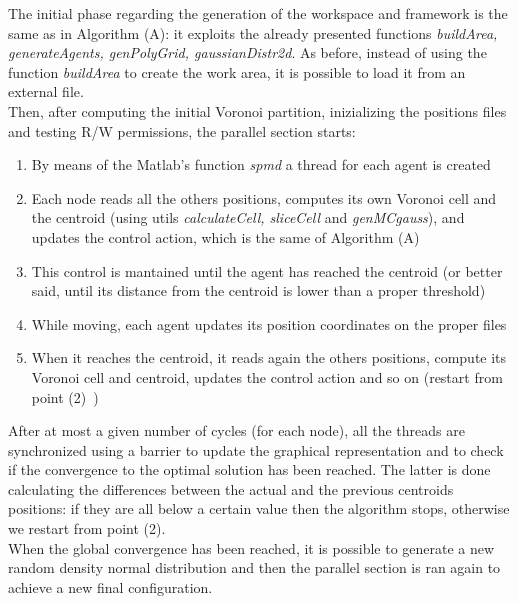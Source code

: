 \documentclass[a4paper,11pt,oneside]{book}
\begin{document}
	The initial phase regarding the generation of the workspace and framework is the same as in Algorithm (A): it exploits the already presented functions \textit{buildArea, generateAgents, genPolyGrid, gaussianDistr2d}. As before, instead of using the function \textit{buildArea} to create the work area, it is possible to load it from an external file.\\
	
	Then, after computing the initial Voronoi partition, inizializing the positions files and testing R/W permissions, the parallel section starts:
	\begin{enumerate}
		
	\item  By means of the Matlab's function \textit{spmd} a thread for each agent is created
	 
	\item Each node reads all the others positions, computes its own Voronoi cell and the centroid (using utils \textit{calculateCell, sliceCell} and \textit{genMCgauss}), and updates the control action, which is the same of Algorithm (A)
	 
	\item This control is mantained until the agent has reached the centroid (or better said, until its distance from the centroid is lower than a proper threshold)
	
	\item While moving, each agent updates its position coordinates on the proper files 
	
	\item When it reaches the centroid, it reads again the others positions, compute its Voronoi cell and centroid, updates the control action and so on (restart from point (2)\ )
	\end{enumerate} 
	After at most a given number of cycles (for each node), all the threads are synchronized using a barrier to update the graphical representation and to check if the convergence to the optimal solution has been reached. The latter is done calculating the differences between the actual and the previous centroids positions: if they are all below a certain value then the algorithm stops, otherwise we restart from point (2).\\
	
	When the global convergence has been reached, it is possible to generate a new random density normal distribution and then the parallel section is ran again to achieve a new final configuration.\\
	
\end{document}
